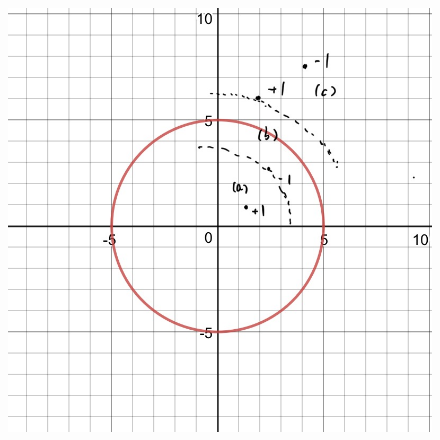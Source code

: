 \documentclass[a4paper,12pt]{article}
\begin{document}
\begin{figure}
    \centering
    \includegraphics[width = .6\textwidth]{prob32}
    \caption{}
    \label{prob32}
\end{figure}
\end{document}
